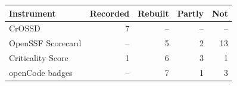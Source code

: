 \begin{tabular}{lrrrr}
\toprule
Instrument & Recorded & Rebuilt & Partly & Not \\
\midrule
CrOSSD & 7 & -- & -- & -- \\
OpenSSF Scorecard & -- & 5 & 2 & 13 \\
Criticality Score & 1 & 6 & 3 & 1 \\
openCode badges & -- & 7 & 1 & 3 \\
\bottomrule
\end{tabular}
